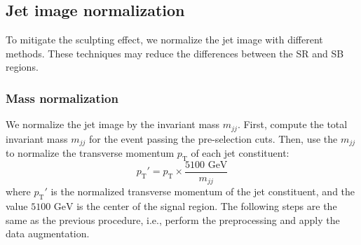 \documentclass[12pt]{article}
\begin{document}
	\subsection{Jet image normalization}%
	\label{sub:jet_image_normalization}
		To mitigate the sculpting effect, we normalize the jet image with different methods. These techniques may reduce the differences between the SR and SB regions.
		\subsubsection{Mass normalization}%
		\label{subs:mass_normalization}
			We normalize the jet image by the invariant mass $m_{jj}$. First, compute the total invariant mass $m_{jj}$ for the event passing the pre-selection cuts. Then, use the $m_{jj}$ to normalize the transverse momentum $p_{\text{T}}$ of each jet constituent:
			\begin{equation}
				p_{\text{T}}' = p _{\text{T}} \times  \frac{\text{5100 GeV}}{m_{jj}}
			\end{equation}
			where $p_{\text{T}}'$ is the normalized transverse momentum of the jet constituent, and the value $5100 \text{ GeV}$ is the center of the signal region. The following steps are the same as the previous procedure, i.e., perform the preprocessing and apply the data augmentation.
\end{document}
